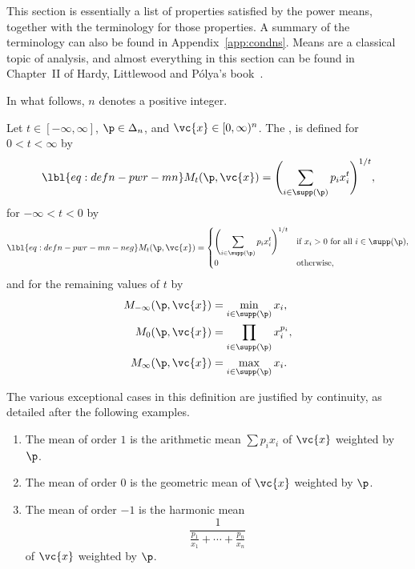 This
section is essentially a list of properties satisfied by the power means,
together with the terminology for those properties.  A summary of the
terminology can also be found in Appendix~\ref{app:condns}.
% 
Means are a classical topic of analysis, and almost everything in this
section can be found in Chapter~II of Hardy, Littlewood and P\'olya's
book~\cite{HLP}.

In what follows, $n$ denotes a positive integer.

\begin{defn}
Let $t \in [-\infty, \infty]$, $\p \in \Delta_n$, and $\vc{x} \in [0,
\infty)^n$.  The , is defined for $0 < t < \infty$ by
% 
\begin{equation}
\lbl{eq:defn-pwr-mn}
M_t(\p, \vc{x})
=
\Biggl( \sum_{i \in \supp(\p)} p_i x_i^t \Biggr)^{1/t},
\end{equation}
% 
for $-\infty < t < 0$ by
% 
\begin{equation}
\lbl{eq:defn-pwr-mn-neg}
M_t(\p, \vc{x})
=
\begin{cases}
\displaystyle
\Biggl( \sum_{i \in \supp(\p)} p_i x_i^t \Biggr)^{1/t}  &
\text{if } x_i > 0 \text{ for all } i \in \supp(\p),    \\
\displaystyle
0       &
\text{otherwise},
\end{cases}
\end{equation}
% 
and for the remaining values of $t$ by 
% 
\begin{align*}
M_{-\infty}(\p, \vc{x}) &
=
\min_{i \in \supp(\p)} x_i,     \\
M_0(\p, \vc{x}) &
=
\prod_{i \in \supp(\p)} x_i^{p_i},      \\
M_\infty(\p, \vc{x})    &
=
\max_{i \in \supp(\p)} x_i.
\end{align*}
% 
\end{defn}

The various exceptional cases in this definition are justified by
continuity, as detailed after the following examples.

\begin{examples}
\begin{enumerate}
\item 
The mean of order $1$ is the arithmetic mean $\sum
p_i x_i$ of $\vc{x}$ weighted by $\p$.

\item
The mean of order $0$ is the geometric mean of
$\vc{x}$ weighted by $\p$.

\item
The mean of order $-1$ is the harmonic mean
\[
\frac{1}{\frac{p_1}{x_1} + \cdots + \frac{p_n}{x_n}}
\]
of $\vc{x}$ weighted by $\p$.
\end{enumerate}
\end{examples}

